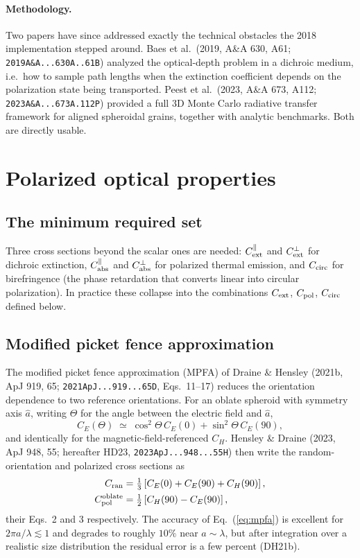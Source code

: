 \documentclass{my_memo}
\newcommand{\code}[1]{\texttt{#1}}
\newcommand{\Cext}{\ensuremath{C_{\rm ext}}}
\newcommand{\Cabs}{\ensuremath{C_{\rm abs}}}
\newcommand{\Cpol}{\ensuremath{C_{\rm pol}}}
\newcommand{\Ccirc}{\ensuremath{C_{\rm circ}}}
\begin{document}
\paragraph{Methodology.} Two papers have since addressed exactly the
technical obstacles the 2018 implementation stepped around. Baes et al.\
(2019, A\&A 630, A61; \code{2019A\&A...630A..61B}) analyzed the
optical-depth problem in a dichroic medium, i.e.\ how to sample path
lengths when the extinction coefficient depends on the polarization state
being transported. Peest et al.\ (2023, A\&A 673, A112;
\code{2023A\&A...673A.112P}) provided a full 3D Monte Carlo radiative
transfer framework for aligned spheroidal grains, together with analytic
benchmarks. Both are directly usable.

\section{Polarized optical properties}
\label{sec:optics}

\subsection{The minimum required set}

Three cross sections beyond the scalar ones are needed:
$\Cext^{\parallel}$ and $\Cext^{\perp}$ for dichroic extinction,
$\Cabs^{\parallel}$ and $\Cabs^{\perp}$ for polarized thermal emission,
and $\Ccirc$ for birefringence (the phase retardation that converts
linear into circular polarization). In practice these collapse into the
combinations $\Cext$, $\Cpol$, $\Ccirc$ defined below.

\subsection{Modified picket fence approximation}

The modified picket fence approximation (MPFA) of Draine \& Hensley
(2021b, ApJ 919, 65; \code{2021ApJ...919...65D}, Eqs.~11--17) reduces the
orientation dependence to two reference orientations. For an oblate
spheroid with symmetry axis $\hat a$, writing $\Theta$ for the angle
between the electric field and $\hat a$,
\begin{equation}
  C_E(\Theta) \;\simeq\; \cos^2\Theta\,C_E(0) + \sin^2\Theta\,C_E(90),
  \label{eq:mpfa}
\end{equation}
and identically for the magnetic-field-referenced $C_H$. Hensley \&
Draine (2023, ApJ 948, 55; hereafter HD23, \code{2023ApJ...948...55H})
then write the random-orientation and polarized cross sections as
\begin{align}
  C_{\rm ran} &= \tfrac13\left[C_E(0) + C_E(90) + C_H(90)\right],
    \label{eq:cran} \\
  C_{\rm pol}^{\rm oblate} &= \tfrac12\left[C_H(90) - C_E(90)\right],
    \label{eq:cpol}
\end{align}
their Eqs.~2 and 3 respectively. The accuracy of Eq.~(\ref{eq:mpfa}) is
excellent for $2\pi a/\lambda \lesssim 1$ and degrades to roughly $10\%$
near $a \sim \lambda$, but after integration over a realistic size
distribution the residual error is a few percent (DH21b).
\end{document}
